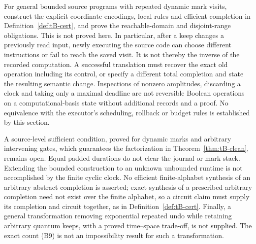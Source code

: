 \begin{problem}
\label{prob:tB-compiler}
For general bounded source programs with repeated dynamic mark visits,
construct the explicit coordinate encodings, local rules and efficient
completion in Definition~\ref{def:tB-cert}, and prove the reachable-domain
and disjoint-range obligations. This is not proved here. In particular,
after a keep changes a previously read input, newly executing the source
code can choose different instructions or fail to reach the saved visit.
It is not thereby the inverse of the recorded computation. A successful
translation must recover the exact old operation including its control,
or specify a different total completion and state the resulting semantic
change. Inspections of nonzero amplitudes, discarding a clock and taking
only a maximal deadline are not reversible Boolean operations on a
computational-basis state without additional records and a proof.
No equivalence with the executor's scheduling, rollback or budget rules
is established by this section.
\end{problem}

\begin{problem}
A source-level sufficient condition, proved for dynamic marks and arbitrary
intervening gates, which guarantees the factorization in
Theorem~\ref{thm:tB-clean}, remains open. Equal padded durations do not
clear the journal or mark stack. Extending the bounded construction to
an unknown unbounded runtime is not accomplished by the finite cyclic
clock. No efficient finite-alphabet synthesis of an arbitrary abstract
completion is asserted; exact synthesis of a prescribed arbitrary
completion need not exist over the finite alphabet, so a circuit claim
must supply its completion and circuit together, as in
Definition~\ref{def:tB-cert}. Finally, a general transformation
removing exponential repeated undo while retaining arbitrary quantum
keeps, with a proved time--space trade-off, is not supplied. The exact
count (B9) is not an impossibility result for such a transformation.
\end{problem}
